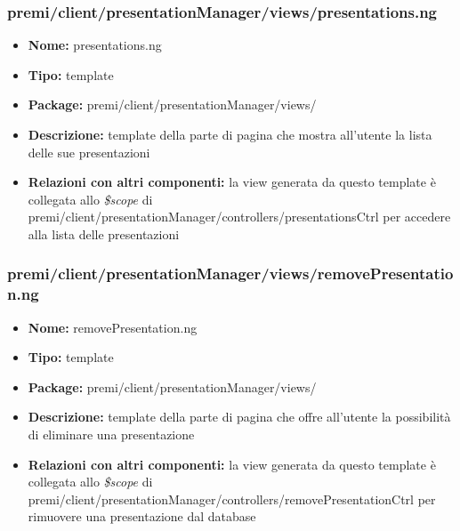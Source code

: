 \subsubsection{premi/client/presentationManager/views/presentations.ng}
\begin{itemize}
  \item[] \textbf{Nome:} presentations.ng
  \item[] \textbf{Tipo:} template
  \item[] \textbf{Package:} premi/client/presentationManager/views/
  \item[] \textbf{Descrizione:} template della parte di pagina che mostra all'utente la lista delle sue presentazioni
  \item[] \textbf{Relazioni con altri componenti:} la view generata da questo template è collegata allo \textit{\$scope} di premi/client/presentationManager/controllers/presentationsCtrl per accedere alla lista delle presentazioni
\end{itemize}

\subsubsection{premi/client/presentationManager/views/removePresentation.ng}
\begin{itemize}
  \item[] \textbf{Nome:} removePresentation.ng
  \item[] \textbf{Tipo:} template 
  \item[] \textbf{Package:} premi/client/presentationManager/views/
  \item[] \textbf{Descrizione:} template della parte di pagina che offre all'utente la possibilità di eliminare una presentazione 
  \item[] \textbf{Relazioni con altri componenti:} la view generata da questo template è collegata allo \textit{\$scope} di premi/client/presentationManager/controllers/removePresentationCtrl per rimuovere una presentazione dal database
\end{itemize}

\clearpage
